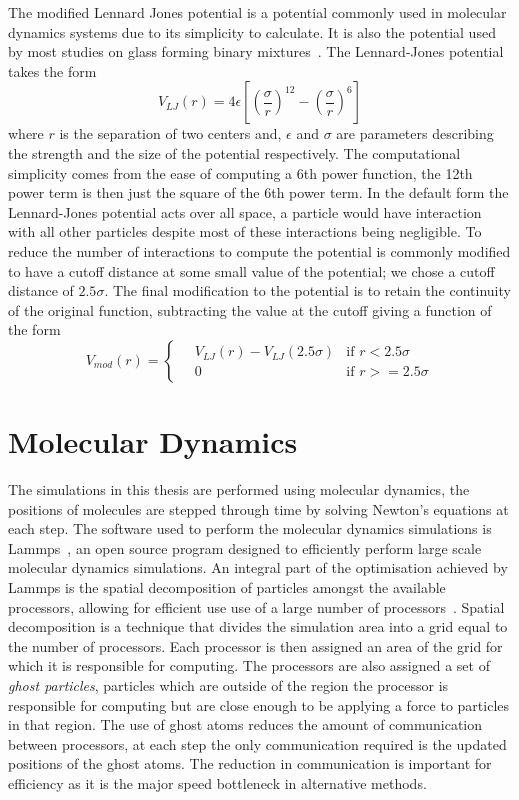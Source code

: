 The modified Lennard Jones potential is a potential commonly used in molecular dynamics systems due to its simplicity to calculate. It is also the potential used by most studies on glass forming binary mixtures~\tocite. The Lennard-Jones potential takes the form
\begin{equation}
    V_{LJ}(r) = 4\epsilon\left [ \left (\frac{\sigma}{r}\right )^{12} -\left ( \frac{\sigma}{r} \right )^6 \right]
\end{equation}
where $r$ is the separation of two centers and, $\epsilon$ and $\sigma$ are parameters describing the strength and the size of the potential respectively. The computational simplicity comes from the ease of computing a 6th power function, the 12th power term is then just the square of the 6th power term. In the default form the Lennard-Jones potential acts over all space, a particle would have interaction with all other particles despite most of these interactions being negligible. To reduce the number of interactions to compute the potential is commonly modified to have a cutoff distance at some small value of the potential; we chose a cutoff distance of $2.5\sigma$. The final modification to the potential is to retain the continuity of the original function, subtracting the value at the cutoff giving a function of the form
\begin{equation}
    V_{mod}(r) = \begin{cases}
        \quad V_{LJ}(r) - V_{LJ}(2.5\sigma) & \text{if } r < 2.5\sigma \\
        \quad 0  &\text{if } r >= 2.5\sigma
    \end{cases}
\end{equation}


\section{Molecular Dynamics}

The simulations in this thesis are performed using molecular dynamics, the positions of molecules are stepped through time by solving Newton's equations at each step. The software used to perform the molecular dynamics simulations is Lammps~\tocite, an open source program designed to efficiently perform large scale molecular dynamics simulations. An integral part of the optimisation achieved by Lammps is the spatial decomposition of particles amongst the available processors, allowing for efficient use use of a large number of processors~\tocite. Spatial decomposition is a technique that divides the simulation area into a grid equal to the number of processors. Each processor is then assigned an area of the grid for which it is responsible for computing. The processors are also assigned a set of \emph{ghost particles}, particles which are outside of the region the processor is responsible for computing but are close enough to be applying a force to particles in that region. The use of ghost atoms reduces the amount of communication between processors, at each step the only communication required is the updated positions of the ghost atoms. The reduction in communication is important for efficiency as it is the major speed bottleneck in alternative methods.

